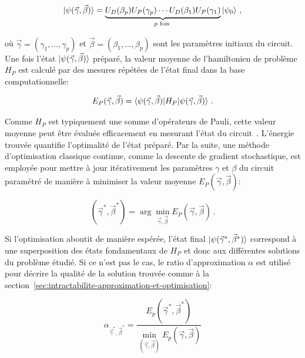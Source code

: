\begin{equation}
    \label{eq:final-state}
    \ket{\psi(\vec{\gamma}, \vec{\beta})} = \underbrace{U_D(\beta_p) U_P(\gamma_p) \cdots U_D(\beta_1) U_P(\gamma_1)}_{p \text{ fois }} \ket{\psi_{0}} \,,
\end{equation}

où $\vec{\gamma} = (\gamma_{1}, \dots, \gamma_{p})$ et $\vec{\beta} = (\beta_{1}, \dots, \beta_{p})$ sont les paramètres initiaux du circuit. Une fois l'état $\ket{\psi(\vec{\gamma}, \vec{\beta})}$ préparé, la valeur moyenne de l'hamiltonien de problème $H_{P}$ est calculé par des mesures répétées de l'état final dans la base computationnelle:

\begin{equation}
    E_{P} (\vec{\gamma}, \vec{\beta}) = \braket{ \psi(\vec{\gamma}, \vec{\beta}) | H_{P} | \psi(\vec{\gamma}, \vec{\beta}) } \,.
\end{equation}

Comme $H_{P}$ est typiquement une somme d'opérateurs de Pauli, cette valeur moyenne peut être évaluée efficacement en mesurant l'état du circuit~\cite{nielsenQuantumComputationQuantum2011}. L'énergie trouvée quantifie l'optimalité de l'état préparé. Par la suite, une méthode d'optimisation classique continue, comme la descente de gradient stochastique, est employée pour mettre à jour itérativement les paramètres $\gamma$ et $\beta$ du circuit paramétré de manière à minimiser la valeur moyenne $E_{P} (\vec{\gamma}, \vec{\beta})$:

\begin{equation}
    (\vec{\gamma}^{*}, \vec{\beta}^{*}) = \arg \min_{{\vec{\gamma}, \vec{\beta}}} E_{P}(\vec{\gamma}, \vec{\beta}) \,.
\end{equation}

Si l'optimisation aboutit de manière espérée, l'état final $\ket{\psi(\vec{\gamma}^{*}, \vec{\beta}^{*})}$ correspond à une superposition des états fondamentaux de $H_{P}$ et donc aux différentes solutions du problème étudié. Si ce n'est pas le cas, le ratio d'approximation $\alpha$ est utilisé pour décrire la qualité de la solution trouvée comme à la section~\ref{sec:intractabilite-approximation-et-optimisation}:

\begin{equation}
    \alpha_{\vec{\gamma}^{*}, \vec{\beta}^{*}} = \frac{ E_{p} (\vec{\gamma}^{*}, \vec{\beta}^{*})}{\min_{(\vec{\gamma}, \vec{\beta})} E_{p} (\vec{\gamma}, \vec{\beta}) }
\end{equation}

